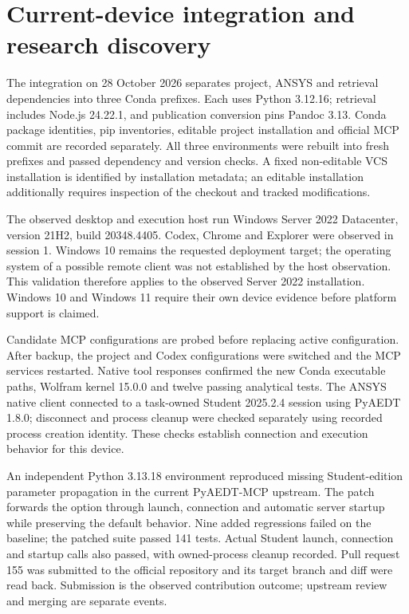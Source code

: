 \section{Current-device integration and research discovery}
\label{chapter:07}

\hypertarget{auto.07.conda}{}
The integration on 28 October 2026 separates project, ANSYS and retrieval dependencies into three Conda prefixes. Each uses Python 3.12.16; retrieval includes Node.js 24.22.1, and publication conversion pins Pandoc 3.13. Conda package identities, pip inventories, editable project installation and official MCP commit are recorded separately. All three environments were rebuilt into fresh prefixes and passed dependency and version checks. A fixed non-editable VCS installation is identified by installation metadata; an editable installation additionally requires inspection of the checkout and tracked modifications.

\hypertarget{auto.07.platform}{}
The observed desktop and execution host run Windows Server 2022 Datacenter, version 21H2, build 20348.4405. Codex, Chrome and Explorer were observed in session 1. Windows 10 remains the requested deployment target; the operating system of a possible remote client was not established by the host observation. This validation therefore applies to the observed Server 2022 installation. Windows 10 and Windows 11 require their own device evidence before platform support is claimed.

\hypertarget{auto.07.switch}{}
Candidate MCP configurations are probed before replacing active configuration. After backup, the project and Codex configurations were switched and the MCP services restarted. Native tool responses confirmed the new Conda executable paths, Wolfram kernel 15.0.0 and twelve passing analytical tests. The ANSYS native client connected to a task-owned Student 2025.2.4 session using PyAEDT 1.8.0; disconnect and process cleanup were checked separately using recorded process creation identity. These checks establish connection and execution behavior for this device.

\hypertarget{auto.07.student}{}
An independent Python 3.13.18 environment reproduced missing Student-edition parameter propagation in the current PyAEDT-MCP upstream. The patch forwards the option through launch, connection and automatic server startup while preserving the default behavior. Nine added regressions failed on the baseline; the patched suite passed 141 tests. Actual Student launch, connection and startup calls also passed, with owned-process cleanup recorded. Pull request 155 was submitted to the official repository and its target branch and diff were read back. Submission is the observed contribution outcome; upstream review and merging are separate events. \cite{PYAEDTMCP}


